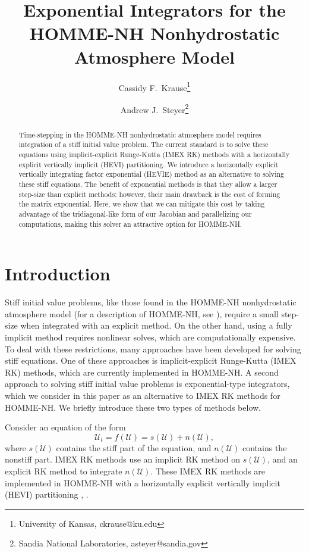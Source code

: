 \documentclass{csri19}
\title{Exponential Integrators for the HOMME-NH Nonhydrostatic Atmosphere
 Model}
\author{Cassidy F.\ Krause\thanks{University of Kansas, ckrause@ku.edu}
\and Andrew J.\ Steyer\thanks{Sandia National Laboratories, asteyer@sandia.gov}}
\newcommand{\CFKU}{\mathcal{U}}
\begin{document}
\maketitle

\begin{abstract}
Time-stepping in the HOMME-NH nonhydrostatic atmosphere model requires 
integration of a stiff initial value problem. The current standard is to 
solve these equations using implicit-explicit Runge-Kutta (IMEX RK) 
methods with a horizontally explicit vertically implicit (HEVI) 
partitioning. We introduce a horizontally explicit vertically integrating 
factor exponential (HEVIE) method as an alternative to solving 
these stiff equations. The benefit of exponential methods is that they 
allow a larger step-size than explicit methods; however, their main 
drawback is the cost of forming the matrix exponential. Here, we show that 
we can mitigate this cost by taking advantage of the tridiagonal-like form 
of our Jacobian and parallelizing our computations, making this solver an 
attractive option for HOMME-NH.
\end{abstract}

\section{Introduction} \label{CFK:sec:intro}
Stiff initial value problems, like those found in the HOMME-NH 
nonhydrostatic atmosphere model (for a description of HOMME-NH, see 
\cite{CFK:preprint}), require a small step-size when integrated 
with an explicit method. On the other hand, using a fully implicit method 
requires nonlinear solves, which are computationally expensive. To deal 
with these restrictions, many approaches have been developed for solving 
stiff equations. One of these approaches is implicit-explicit Runge-Kutta 
(IMEX RK) methods, which are currently implemented in HOMME-NH. A second 
approach to solving stiff initial value problems is exponential-type 
integrators, which we consider in this paper as an alternative to IMEX RK 
methods for HOMME-NH. We briefly introduce these two types of methods 
below.

Consider an equation of the form \[ \CFKU_t = f(\CFKU) = s(\CFKU) + 
n(\CFKU),\] where $s(\CFKU)$ contains the stiff part of the equation, and 
$n(\CFKU)$ contains the nonstiff part. IMEX RK methods use an implicit RK 
method on $s(\CFKU)$, and an explicit RK method to integrate $n(\CFKU)$. 
These IMEX RK methods are implemented in HOMME-NH with a horizontally 
explicit vertically implicit (HEVI) partitioning \cite{CFK:Steyer2019},
\cite{CFK:Vogl2019}.
\end{document}
